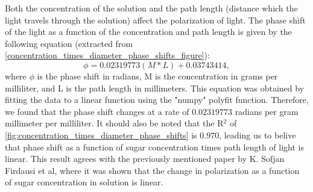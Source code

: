 

Both the concentration of the solution and the path length (distance which the light travels through the solution) affect the polarization of light. The phase shift of the light as a function of the concentration and path length is given by the following equation (extracted from \cref{concentration_times_diameter_phase_shifts_figure}):
\begin{equation}
\phi = 0.02319773(M*L) + 0.03743414,
\end{equation}
where $\phi$ is the phase shift in radians, M is the concentration in grams per milliliter, and L is the path length in millimeters. This equation was obtained by fitting the data to a linear function using the "numpy" polyfit function. Therefore, we found that the phase shift changes at a rate of $0.02319773$ radians per gram millimeter per milliliter. It should also be noted that the R$^2$ of \ref{fig:concentration_times_diameter_phase_shifts} is $0.970$, leading us to belive that phase shift as a function of sugar concentration times path length of light is linear. This result agrees with the previously mentioned paper by K. Sofjan Firdausi et al, where it was shown that the change in polarization as a function of sugar concentration in solution is linear\cite{Firsdausi2018}.

